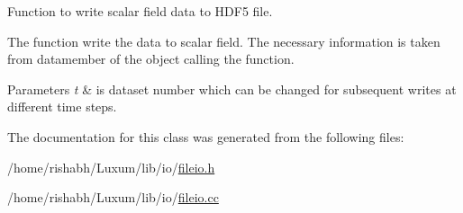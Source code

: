 Function to write scalar field data to H\+D\+F5 file. 

The function write the data to scalar field. The necessary information is taken from datamember of the object calling the function.


\begin{DoxyParams}{Parameters}
{\em t} & is dataset number which can be changed for subsequent writes at different time steps. \\
\hline
\end{DoxyParams}


The documentation for this class was generated from the following files\+:\begin{DoxyCompactItemize}
\item 
/home/rishabh/\+Luxum/lib/io/\hyperlink{fileio_8h}{fileio.\+h}\item 
/home/rishabh/\+Luxum/lib/io/\hyperlink{fileio_8cc}{fileio.\+cc}\end{DoxyCompactItemize}
